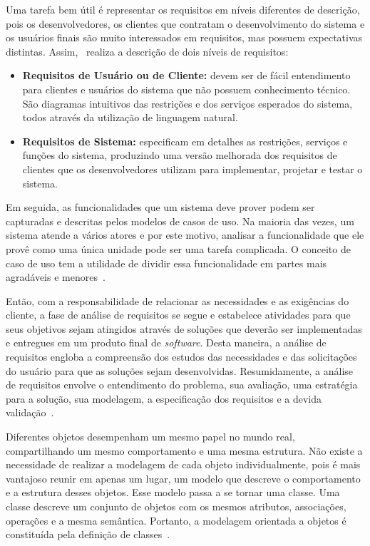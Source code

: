 Uma tarefa bem útil é representar os requisitos em níveis diferentes de descrição, pois os desenvolvedores, os clientes que contratam o desenvolvimento do sistema e os usuários finais são muito interessados em requisitos, mas possuem expectativas distintas. Assim,~ realiza a descrição de dois níveis de requisitos:

\begin{itemize}
	\item \textbf{Requisitos de Usuário ou de Cliente:} devem ser de fácil entendimento para clientes e usuários do sistema que não possuem conhecimento técnico. São diagramas intuitivos das restrições e dos serviços esperados do sistema, todos através da utilização de linguagem natural.
	
	\item \textbf{Requisitos de Sistema:} especificam em detalhes as restrições, serviços e funções do sistema, produzindo uma versão melhorada dos requisitos de clientes que os desenvolvedores utilizam para implementar, projetar e testar o sistema. 
\end{itemize}

Em seguida, as funcionalidades que um sistema deve prover podem ser capturadas e descritas pelos modelos de casos de uso. Na maioria das vezes, um sistema atende a vários atores e por este motivo, analisar a funcionalidade que ele provê como uma única unidade pode ser uma tarefa complicada. O conceito de caso de uso tem a utilidade de dividir essa funcionalidade em partes mais agradáveis e menores~\cite{olive:cmis07}.

Então, com a responsabilidade de relacionar as necessidades e as exigências do cliente, a fase de análise de requisitos se segue e estabelece atividades para que seus objetivos sejam atingidos através de soluções que deverão ser implementadas e entregues em um produto final de \textit{software}. Desta maneira, a análise de requisitos engloba a compreensão dos estudos das necessidades e das solicitações do usuário para que as soluções sejam desenvolvidas. Resumidamente, a análise de requisitos envolve o entendimento do problema, sua avaliação, uma estratégia para a solução, sua modelagem, a especificação dos requisitos e a devida validação~\cite{amui:pds15}.

Diferentes objetos desempenham um mesmo papel no mundo real, compartilhando um mesmo comportamento e uma mesma estrutura. Não existe a necessidade de realizar a modelagem de cada objeto individualmente, pois é mais vantajoso reunir em apenas um lugar, um modelo que descreve o comportamento e a estrutura desses objetos. Esse modelo passa a se tornar uma classe. Uma classe descreve um conjunto de objetos com os mesmos atributos, associações, operações e a mesma semântica. Portanto, a modelagem orientada a objetos é constituída pela definição de classes~\cite{falbo:er17}.

